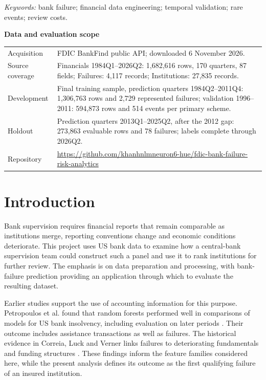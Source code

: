\documentclass[11pt,a4paper]{article}
\begin{document}
\begin{titlepage}
\begin{minipage}{.92\textwidth}
\end{minipage}\par
\vspace{5mm}
\begin{minipage}{\textwidth}
\small{}\setlength{\parindent}{0pt}
\textit{Keywords:} bank failure; financial data engineering; temporal validation; rare events; review costs.
\par\vspace{4mm}
\textbf{Data and evaluation scope}\par\vspace{2mm}
\begin{tabularx}{\linewidth}{@{}p{.24\linewidth}X@{}}
\toprule
Acquisition & FDIC BankFind public API; downloaded 6 November 2026.\\
Source coverage & Financials 1984Q1--2026Q2: 1,682,616 rows, 170 quarters, 87 fields; Failures: 4,117 records; Institutions: 27,835 records.\\
Development & Final training sample, prediction quarters 1984Q2--2011Q4: 1,306,763 rows and 2,729 represented failures; validation 1996--2011: 594,873 rows and 514 events per primary scheme.\\
Holdout & Prediction quarters 2013Q1--2025Q2, after the 2012 gap: 273,863 evaluable rows and 78 failures; labels complete through 2026Q2.\\
Repository & \url{https://github.com/khanhnlmneuron6-hue/fdic-bank-failure-risk-analytics}\\
\bottomrule
\end{tabularx}
\end{minipage}
\end{titlepage}
\section*{Introduction}
Bank supervision requires financial reports that remain comparable as institutions merge, reporting conventions change and economic conditions deteriorate. This project uses US bank data to examine how a central-bank supervision team could construct such a panel and use it to rank institutions for further review. The emphasis is on data preparation and processing, with bank-failure prediction providing an application through which to evaluate the resulting dataset.

Earlier studies support the use of accounting information for this purpose. Petropoulos et al. found that random forests performed well in comparisons of models for US bank insolvency, including evaluation on later periods \citep{petropoulos}. Their outcome includes assistance transactions as well as failures. The historical evidence in Correia, Luck and Verner links failures to deteriorating fundamentals and funding structures \citep{failingbanks}. These findings inform the feature families considered here, while the present analysis defines its outcome as the first qualifying failure of an insured institution.
\end{document}
